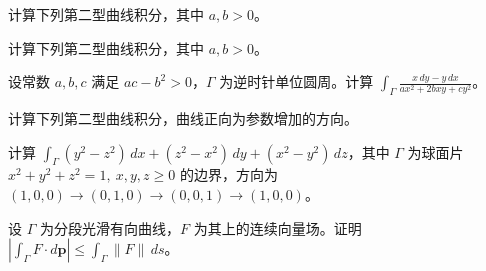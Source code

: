 \newpage
\noindent\begin{minipage}{\textwidth}
计算下列第二型曲线积分，其中 $a,b>0$。
\end{minipage}\par\vfill
\noindent\begin{minipage}{\textwidth}
计算下列第二型曲线积分，其中 $a,b>0$。
\end{minipage}\par\vfill
\noindent\begin{minipage}{\textwidth}
设常数 $a,b,c$ 满足 $ac-b^2>0$，$\Gamma$ 为逆时针单位圆周。计算 $\displaystyle\int_\Gamma\frac{x\,dy-y\,dx}{ax^2+2bxy+cy^2}$。
\end{minipage}\par\vfill
\newpage
\noindent\begin{minipage}{\textwidth}
计算下列第二型曲线积分，曲线正向为参数增加的方向。
\end{minipage}\par\vfill
\noindent\begin{minipage}{\textwidth}
计算 $\displaystyle\int_\Gamma(y^2-z^2)\,dx+(z^2-x^2)\,dy+(x^2-y^2)\,dz$，其中 $\Gamma$ 为球面片 $x^2+y^2+z^2=1,\ x,y,z\ge0$ 的边界，方向为 $(1,0,0)\to(0,1,0)\to(0,0,1)\to(1,0,0)$。
\end{minipage}\par\vfill
\noindent\begin{minipage}{\textwidth}
设 $\Gamma$ 为分段光滑有向曲线，$F$ 为其上的连续向量场。证明 $\displaystyle\left|\int_\Gamma F\cdot d\mathbf p\right|\le\int_\Gamma\|F\|\,ds$。
\end{minipage}\par\vfill
